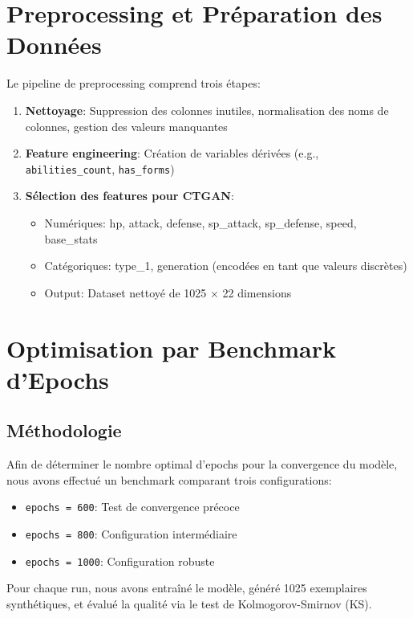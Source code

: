 \documentclass[11pt,a4paper]{article}
\begin{document}
\section{Preprocessing et Préparation des Données}

Le pipeline de preprocessing comprend trois étapes:

\begin{enumerate}
    \item \textbf{Nettoyage}: Suppression des colonnes inutiles, normalisation des noms de colonnes, gestion des valeurs manquantes
    \item \textbf{Feature engineering}: Création de variables dérivées (e.g., \texttt{abilities\_count}, \texttt{has\_forms})
    \item \textbf{Sélection des features pour CTGAN}: 
        \begin{itemize}
            \item Numériques: hp, attack, defense, sp\_attack, sp\_defense, speed, base\_stats
            \item Catégoriques: type\_1, generation (encodées en tant que valeurs discrètes)
            \item Output: Dataset nettoyé de 1025 × 22 dimensions
        \end{itemize}
\end{enumerate}

\section{Optimisation par Benchmark d'Epochs} \label{sec:benchmark}

\subsection{Méthodologie}

Afin de déterminer le nombre optimal d'epochs pour la convergence du modèle, nous avons effectué un benchmark comparant trois configurations:

\begin{itemize}
    \item \texttt{epochs = 600}: Test de convergence précoce
    \item \texttt{epochs = 800}: Configuration intermédiaire
    \item \texttt{epochs = 1000}: Configuration robuste
\end{itemize}

Pour chaque run, nous avons entraîné le modèle, généré 1025 exemplaires synthétiques, et évalué la qualité via le test de Kolmogorov-Smirnov (KS).
\end{document}
